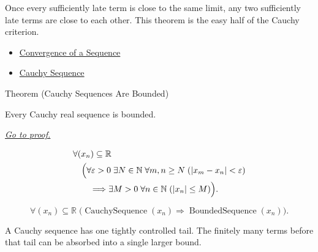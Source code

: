 \begin{remark*}[Interpretation]
Once every sufficiently late term is close to the same limit, any two
sufficiently late terms are close to each other. This theorem is the easy
half of the Cauchy criterion.
\end{remark*}

\begin{dependencies}
\begin{itemize}
  \item \hyperref[def:convergent-sequence]{Convergence of a Sequence}
  \item \hyperref[def:cauchy-sequence]{Cauchy Sequence}
\end{itemize}
\end{dependencies}


\begin{theorembox}{Theorem (Cauchy Sequences Are Bounded)}
\begin{theorem}
\label{thm:cauchy-sequences-are-bounded}
Every Cauchy real sequence is bounded.

\smallskip
\noindent
\hyperref[prf:cauchy-sequences-are-bounded]{\textit{Go to proof.}}
\end{theorem}
\end{theorembox}

\begin{remark*}
\[
\begin{aligned}
&\forall (x_n)\subseteq\mathbb{R}\\
&\quad
\Bigl(
  \forall \varepsilon>0\;\exists N\in\mathbb{N}\;\forall m,n\ge N
  \;( |x_m-x_n|<\varepsilon )\\
&\qquad\Longrightarrow
  \exists M>0\;\forall n\in\mathbb{N}\;( |x_n|\le M )
\Bigr).
\end{aligned}
\]
\end{remark*}

\begin{remark*}
\[
\forall (x_n)\subseteq\mathbb{R}\;
\bigl(
  \operatorname{CauchySequence}(x_n)
  \Longrightarrow
  \operatorname{BoundedSequence}(x_n)
\bigr).
\]
\end{remark*}

\begin{remark*}[Interpretation]
A Cauchy sequence has one tightly controlled tail. The finitely many terms
before that tail can be absorbed into a single larger bound.
\end{remark*}

